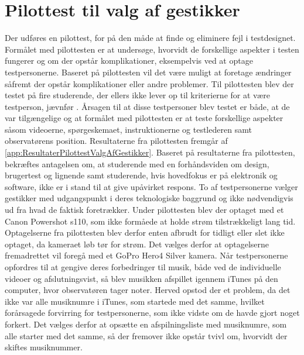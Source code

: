 \section{Pilottest til valg af gestikker}
\label{PilottestValgAfGestikker}
%
Der udføres en pilottest, for på den måde at finde og eliminere fejl i testdesignet. Formålet med pilottesten er at undersøge, hvorvidt de forskellige aspekter i testen fungerer og om der opstår komplikationer, eksempelvis ved at optage testpersonerne. Baseret på pilottesten vil det være muligt at foretage ændringer såfremt der opstår komplikationer eller andre problemer.\blankline
%  
Til pilottesten blev der testet på fire studerende, der ellers ikke lever op til kriterierne for at være testperson, jævnfør . Årsagen til at disse testpersoner blev testet er både, at de var tilgængelige og at formålet med pilottesten er at teste forskellige aspekter såsom videoerne, spørgeskemaet, instruktionerne og testlederen samt observatørens position. Resultaterne fra pilottesten fremgår af \autoref{app:ResultaterPilottestValgAfGestikker}. Baseret på resultaterne fra pilottesten, bekræftes antagelsen om, at studerende med en forhåndsviden om design, brugertest og lignende samt studerende, hvis hovedfokus er på elektronik og software, ikke er i stand til at give upåvirket respons. To af testpersonerne vælger gestikker med udgangspunkt i deres teknologiske baggrund og ikke nødvendigvis ud fra hvad de faktisk foretrækker.\blankline
% 
Under pilottesten blev der optaget med et Canon Powershot s110, som ikke formåede at holde strøm tilstrækkeligt lang tid. Optagelserne fra pilottesten blev derfor enten afbrudt for tidligt eller slet ikke optaget, da kameraet løb tør for strøm. Det vælges derfor at optagelserne fremadrettet vil foregå med et GoPro Hero4 Silver kamera.\blankline
% 
Når testpersonerne opfordres til at gengive deres forbedringer til musik, både ved de individuelle videoer og afslutningsvist, så blev musikken afspillet igennem iTunes på den computer, hvor observatøren tager noter. Herved opstod der et problem, da det ikke var alle musiknumre i iTunes, som startede med det samme, hvilket forårsagede forvirring for testpersonerne, som ikke vidste om de havde gjort noget forkert. Det vælges derfor at opsætte en afspilningsliste med musiknumre, som alle starter med det samme, så der fremover ikke opstår tvivl om, hvorvidt der skiftes musiknummer. 

